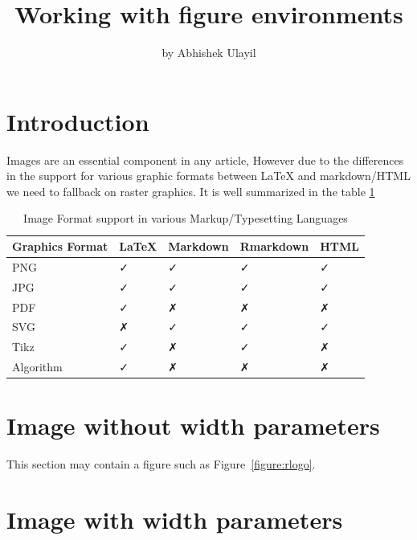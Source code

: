 \title{Working with figure environments}
\author{by Abhishek Ulayil}

\maketitle


\section{Introduction}

Images are an essential component in any article, However due to the differences in the support for various graphic formats between LaTeX and markdown/HTML we need to fallback on raster graphics. It is well summarized in the table \ref{tab:graphics}

\begin{table}[t!]
\begin{center}
\begin{tabular}{l | llll }
 \hline
 Graphics Format & LaTeX & Markdown & Rmarkdown & HTML \\
 \hline
 PNG       & ✓ & ✓ & ✓ & ✓ \\
 JPG       & ✓ & ✓ & ✓ & ✓ \\
 PDF       & ✓ & ✗ & ✗ & ✗ \\
 SVG       & ✗ & ✓ & ✓ & ✓ \\
 Tikz      & ✓ & ✗ & ✓ & ✗ \\
 Algorithm & ✓ & ✗ & ✗ & ✗ \\
\hline
\end{tabular}
\label{tab:graphics} \caption{Image Format support in various Markup/Typesetting Languages}
\end{center}
\end{table}

\section{Image without width parameters}

This section may contain a figure such as Figure~\ref{figure:rlogo}.



\section{Image with width parameters}

